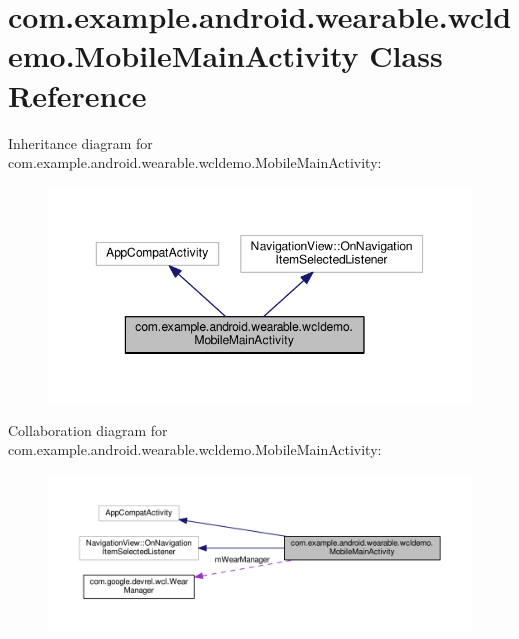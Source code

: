 \hypertarget{classcom_1_1example_1_1android_1_1wearable_1_1wcldemo_1_1MobileMainActivity}{}\section{com.\+example.\+android.\+wearable.\+wcldemo.\+Mobile\+Main\+Activity Class Reference}
\label{classcom_1_1example_1_1android_1_1wearable_1_1wcldemo_1_1MobileMainActivity}


Inheritance diagram for com.\+example.\+android.\+wearable.\+wcldemo.\+Mobile\+Main\+Activity\+:
\nopagebreak
\begin{figure}[H]
\begin{center}
\leavevmode
\includegraphics[width=350pt]{d2/d7c/classcom_1_1example_1_1android_1_1wearable_1_1wcldemo_1_1MobileMainActivity__inherit__graph}
\end{center}
\end{figure}


Collaboration diagram for com.\+example.\+android.\+wearable.\+wcldemo.\+Mobile\+Main\+Activity\+:
\nopagebreak
\begin{figure}[H]
\begin{center}
\leavevmode
\includegraphics[width=350pt]{d7/d96/classcom_1_1example_1_1android_1_1wearable_1_1wcldemo_1_1MobileMainActivity__coll__graph}
\end{center}
\end{figure}

